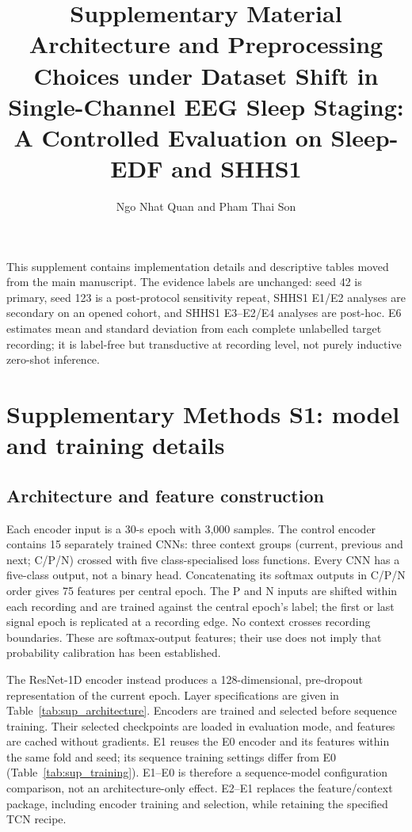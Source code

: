 \documentclass[10pt,a4paper]{article}
\title{Supplementary Material\\\large Architecture and Preprocessing Choices under Dataset Shift in Single-Channel EEG Sleep Staging: A Controlled Evaluation on Sleep-EDF and SHHS1}
\author{Ngo Nhat Quan and Pham Thai Son}
\date{}
\begin{document}
\maketitle

This supplement contains implementation details and descriptive tables moved from the main manuscript.
The evidence labels are unchanged: seed 42 is primary, seed 123 is a post-protocol sensitivity repeat,
SHHS1 E1/E2 analyses are secondary on an opened cohort, and SHHS1 E3--E2/E4 analyses are post-hoc.
E6 estimates mean and standard deviation from each complete unlabelled target recording; it is label-free
but transductive at recording level, not purely inductive zero-shot inference.

\section*{Supplementary Methods S1: model and training details}

\subsection*{Architecture and feature construction}

Each encoder input is a 30-s epoch with 3,000 samples. The control encoder contains 15 separately
trained CNNs: three context groups (current, previous and next; C/P/N) crossed with five
class-specialised loss functions. Every CNN has a five-class output, not a binary head. Concatenating
its softmax outputs in C/P/N order gives 75 features per central epoch. The P and N inputs are shifted
within each recording and are trained against the central epoch's label; the first or last signal
epoch is replicated at a recording edge. No context crosses recording boundaries. These are
softmax-output features; their use does not imply that probability calibration has been established.

The ResNet-1D encoder instead produces a 128-dimensional, pre-dropout representation of the current
epoch. Layer specifications are given in Table~\ref{tab:sup_architecture}. Encoders are trained and
selected before sequence training. Their selected checkpoints are loaded in evaluation mode, and
features are cached without gradients. E1 reuses the E0 encoder and its features within the same
fold and seed; its sequence training settings differ from E0 (Table~\ref{tab:sup_training}). E1--E0
is therefore a sequence-model configuration comparison, not an architecture-only effect. E2--E1
replaces the feature/context package, including encoder training and selection, while retaining the
specified TCN recipe.
\end{document}
